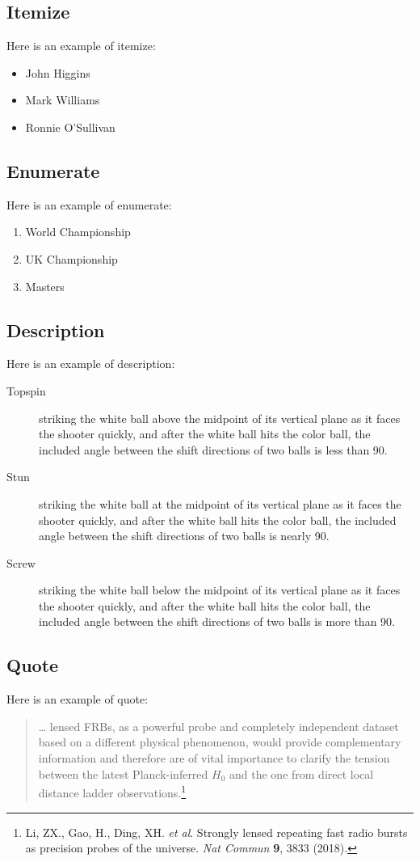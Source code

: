 \documentclass[a4paper,10pt]{article}
\begin{document}
    \subsection{Itemize}
    Here is an example of itemize:
    \begin{itemize}
        \item John Higgins
        \item Mark Williams
        \item Ronnie O'Sullivan
    \end{itemize}
    \subsection{Enumerate}
    Here is an example of enumerate:
    \begin{enumerate}
        \item World Championship
        \item UK Championship
        \item Masters
    \end{enumerate}
    \subsection{Description}
    Here is an example of description:
    \begin{description}
        \item[Topspin] striking the white ball above the midpoint of its
        vertical plane as it faces the shooter quickly, and after the white
        ball hits the color ball, the included angle between the shift
        directions of two balls is less than 90\textdegree{}.
        \item[Stun] striking the white ball at the midpoint of its vertical
        plane as it faces the shooter quickly, and after the white ball hits
        the color ball, the included angle between the shift directions of two
        balls is nearly 90\textdegree{}.
        \item[Screw] striking the white ball below the midpoint of its vertical
        plane as it faces the shooter quickly, and after the white ball hits
        the color ball, the included angle between the shift directions of two
        balls is more than 90\textdegree{}.
    \end{description}
    \subsection{Quote}
    Here is an example of quote:
    \begin{quote}
        \dots{} lensed FRBs, as a powerful probe and completely independent
        dataset based on a different physical phenomenon, would provide
        complementary information and therefore are of vital importance to
        clarify the tension between the latest Planck-inferred $H_0$ and the
        one from direct local distance ladder observations.\footnote{
            Li, ZX., Gao, H., Ding, XH. \textit{et al}. Strongly lensed
            repeating fast radio bursts as precision probes of the universe.
            \textit{Nat Commun} \textbf{9}, 3833 (2018).}
    \end{quote}
\end{document}
